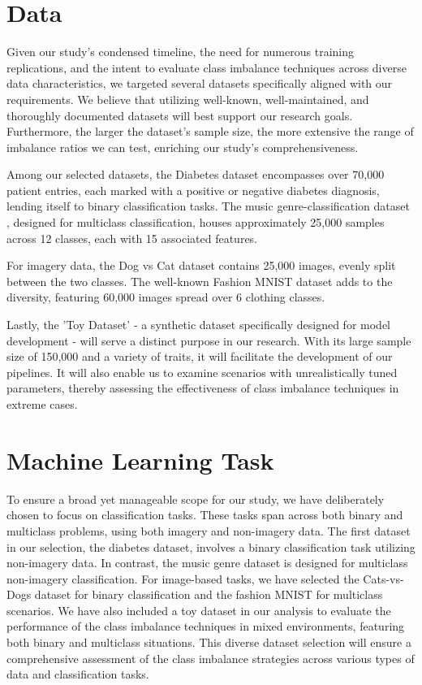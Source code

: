 \documentclass[journal]{IEEEtran}
\begin{document}
	
	\section{Data}
	
		Given our study's condensed timeline, the need for numerous training replications, and the intent to evaluate class imbalance techniques across diverse data characteristics, we targeted several datasets specifically aligned with our requirements. We believe that utilizing well-known, well-maintained, and thoroughly documented datasets will best support our research goals. Furthermore, the larger the dataset's sample size, the more extensive the range of imbalance ratios we can test, enriching our study's comprehensiveness.
		
		Among our selected datasets, the Diabetes\cite{cdc2022} dataset encompasses over 70,000 patient entries, each marked with a positive or negative diabetes diagnosis, lending itself to binary classification tasks. The music genre-classification dataset \cite{zotero-1494}, designed for multiclass classification, houses approximately 25,000 samples across 12 classes, each with 15 associated features.
		
		For imagery data, the Dog vs Cat dataset \cite{zotero-1490} contains 25,000 images, evenly split between the two classes. The well-known Fashion MNIST dataset \cite{zotero-1492} adds to the diversity, featuring 60,000 images spread over 6 clothing classes.
		
		Lastly, the 'Toy Dataset'\cite{zotero-1488} - a synthetic dataset specifically designed for model development - will serve a distinct purpose in our research. With its large sample size of 150,000 and a variety of traits, it will facilitate the development of our pipelines. It will also enable us to examine scenarios with unrealistically tuned parameters, thereby assessing the effectiveness of class imbalance techniques in extreme cases.
 

	\section{Machine Learning Task}
		
		To ensure a broad yet manageable scope for our study, we have deliberately chosen to focus on classification tasks. These tasks span across both binary and multiclass problems, using both imagery and non-imagery data. The first dataset in our selection, the diabetes dataset, involves a binary classification task utilizing non-imagery data. In contrast, the music genre dataset is designed for multiclass non-imagery classification. For image-based tasks, we have selected the Cats-vs-Dogs dataset for binary classification and the fashion MNIST for multiclass scenarios. We have also included a toy dataset in our analysis to evaluate the performance of the class imbalance techniques in mixed environments, featuring both binary and multiclass situations. This diverse dataset selection will ensure a comprehensive assessment of the class imbalance strategies across various types of data and classification tasks.
\end{document}
